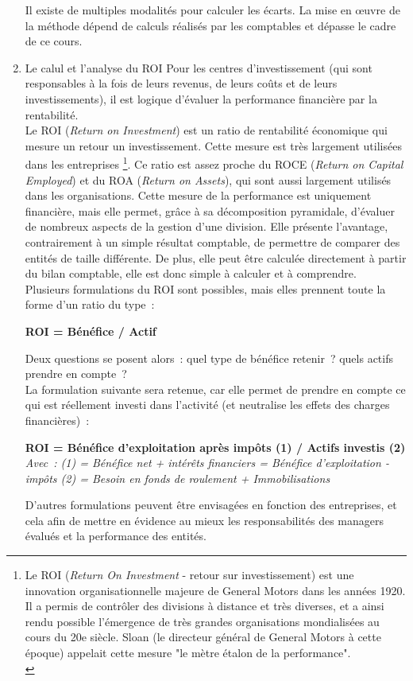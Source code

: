 \documentclass{tufte-handout}
\begin{document}
\begin{enumerate}
\begin{warning}
Il existe de multiples modalités pour calculer les écarts. La mise en œuvre de la méthode dépend de calculs réalisés par les comptables et dépasse le cadre de ce cours.\\
\end{warning}
\item Le calul et l'analyse du ROI
\label{sec:org850ed04}
Pour les centres d'investissement (qui sont responsables à la fois de leurs revenus, de leurs coûts et de leurs investissements), il est logique d'évaluer la performance financière par la rentabilité.\\
Le ROI (\emph{Return on Investment}) est un ratio de rentabilité économique qui mesure un retour un investissement. Cette mesure est très largement utilisées dans les entreprises \footnote{Le ROI (\emph{Return On Investment} - retour sur investissement) est une innovation organisationnelle majeure de General Motors dans les années 1920. Il a permis de contrôler des divisions à distance et très diverses, et a ainsi rendu possible l'émergence de très grandes organisations mondialisées au cours du 20e siècle. Sloan (le directeur général de General Motors à cette époque) appelait cette mesure "le mètre étalon de la performance".\\}. Ce ratio est assez proche du ROCE (\emph{Return on Capital Employed}) et du ROA (\emph{Return on Assets}), qui sont aussi largement utilisés dans les organisations. Cette mesure de la performance est uniquement financière, mais elle permet, grâce à sa décomposition pyramidale, d'évaluer de nombreux aspects de la gestion d'une division. Elle présente l'avantage, contrairement à un simple résultat comptable, de permettre de comparer des entités de taille différente. De plus, elle peut être calculée directement à partir du bilan comptable, elle est donc simple à calculer et à comprendre.\\
Plusieurs formulations du ROI sont possibles, mais elles prennent toute la forme d'un ratio du type :\\
\begin{center}
\textbf{ROI = Bénéfice / Actif}\\
\end{center}
Deux questions se posent alors : quel type de bénéfice retenir ? quels actifs prendre en compte ?\\
La formulation suivante sera retenue, car elle permet de prendre en compte ce qui est réellement investi dans l'activité (et neutralise les effets des charges financières) :\\
\begin{center}
\textbf{ROI = Bénéfice d'exploitation après impôts (1) / Actifs investis (2)}\\
\emph{Avec : (1) = Bénéfice net + intérêts financiers = Bénéfice d'exploitation - impôts (2) = Besoin en fonds de roulement + Immobilisations}\\
\end{center}
D'autres formulations peuvent être envisagées en fonction des entreprises, et cela afin de mettre en évidence au mieux les responsabilités des managers évalués et la performance des entités.\\


\end{enumerate}
\end{document}

